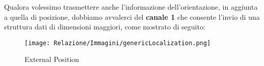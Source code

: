 Qualora volessimo trasmettere anche l’informazione dell’orientazione, in aggiunta a quella di posizione, dobbiamo avvalerci del \textbf{canale 1} che consente l’invio di una struttura dati di dimensioni maggiori, come mostrato di seguito: 
\begin{figure}[h]
    \centering
    \texttt{[image: Relazione/Immagini/genericLocalization.png]}
    \caption{External Position}
    \label{fig:genericLocalization}
\end{figure}

